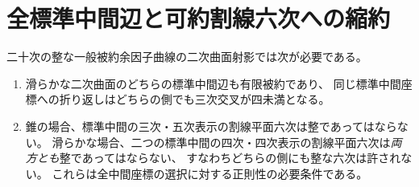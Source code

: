 \section{全標準中間辺と可約割線六次への縮約}
\label{sec:integral-middle-secants}
\begin{theorem}\label{thm:integral-middle-secants}
二十次の整な一般被約余因子曲線の二次曲面射影では次が必要である。
\begin{enumerate}
\item 滑らかな二次曲面のどちらの標準中間辺も有限被約であり、
同じ標準中間座標への折り返しはどちらの側でも三次交叉が四未満となる。
\item 錐の場合、標準中間の三次・五次表示の割線平面六次は整であってはならない。
滑らかな場合、二つの標準中間の四次・四次表示の割線平面六次は\emph{両方とも}整であってはならない、
すなわちどちらの側にも整な六次は許されない。
これらは全中間座標の選択に対する正則性の必要条件である。
\end{enumerate}
\end{theorem}
